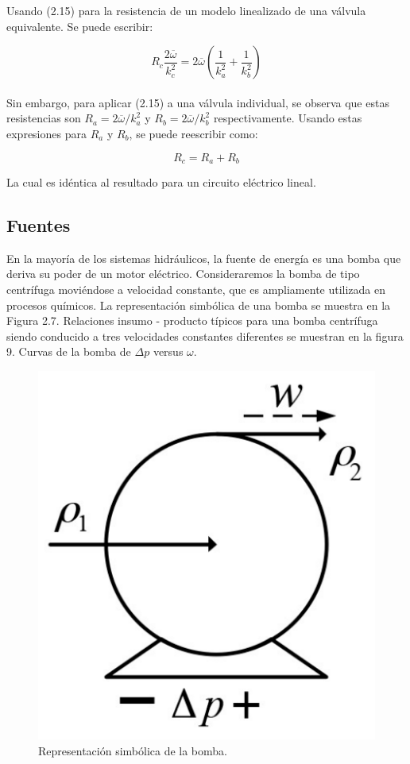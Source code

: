\documentclass[a4paper,12pt,twoside]{proyectotanquesecci}
\begin{document}
Usando (2.15) para la resistencia de un modelo linealizado de una válvula equivalente. Se puede escribir:

\begin{equation}
R_{c}\frac{2\overline{\omega}}{k^{2}_{c}}=
2\overline{\omega}(\frac{1}{k^{2}_{a}}+\frac{1}{k^{2}_{b}})
\end{equation} \\

Sin embargo, para aplicar (2.15) a una válvula individual, se observa que estas resistencias son $R_{a}=2\overline{\omega}/k^{2}_{a}$ y $R_{b}=2\overline{\omega}/k^{2}_{b}$ respectivamente. Usando estas expresiones para $R_{a}$ y $R_{b}$, se puede reescribir como:

\begin{equation}
R_{c}=R_{a}+R_{b}
\end{equation}

La cual es idéntica al resultado para un circuito eléctrico lineal. \\

\subsection{Fuentes}

En la mayoría de los sistemas hidráulicos, la fuente de energía es una bomba que deriva su poder de un motor eléctrico. Consideraremos la bomba de tipo centrífuga moviéndose a velocidad constante, que es ampliamente utilizada en procesos químicos. La representación simbólica de una bomba se muestra en la Figura 2.7. Relaciones insumo - producto típicos para una bomba centrífuga siendo conducido a tres velocidades constantes diferentes se muestran en la figura 9. Curvas de la bomba de $\Delta p$ versus $\omega$.

\begin{figure}[h]
\centering
\includegraphics[scale=0.5]{Figura7}
\renewcommand{\figurename}{Fig.}
\caption{Representación simbólica de la bomba.}
\label{Representación simbólica de la bomba.}
\end{figure}
\end{document}
